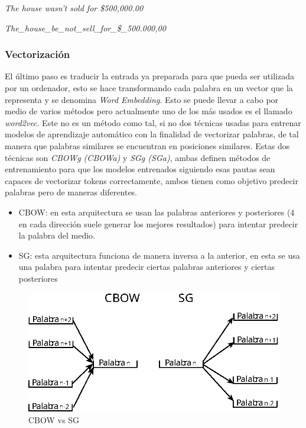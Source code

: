 \begin{center}
	\textit{The house wasn't sold for \$500,000.00}

	\textit{The\_house\_be\_not\_sell\_for\_\$\_500.000,00}
\end{center}

\subsubsection{Vectorización}
El último paso es traducir la entrada ya preparada para que pueda ser utilizada
por un ordenador, esto se hace transformando cada palabra en un vector que la
representa y se denomina \textit{Word Embedding}. Esto se puede llevar a cabo
por medio de varios métodos pero actualmente uno de los más usados es el llamado
\textit{word2vec}\cite{text2vec,text2vecTF}. Este no es un método como tal, si
no dos técnicas usadas para entrenar modelos de aprendizaje automático con la
finalidad de vectorizar palabras, de tal manera que palabras similares se
encuentran en posiciones similares. Estas dos técnicas son
\textit{\gls{CBOWg} (\gls{CBOWa})} y \textit{\gls{SGg} (\gls{SGa})}, ambas definen métodos de entrenamiento para que los
modelos entrenados siguiendo esas pautas sean capaces de vectorizar tokens
correctamente, ambos tienen como objetivo predecir palabras pero de maneras
diferentes.
\begin{itemize}
	\item CBOW: en esta arquitectura se usan las palabras anteriores y
	posteriores (4 en cada dirección suele generar los mejores resultados) para intentar
	predecir la palabra del medio.
	\item SG: esta arquitectura funciona de manera inversa a la anterior, en
	esta se usa una palabra para intentar predecir ciertas palabras anteriores y
	ciertas posteriores
\end{itemize}

\begin{figure}[H]
	\includegraphics[scale=1]{imagenes/CBOWvsSG.eps}
	\centering
	\captionsetup{justification=centering}
	\caption{CBOW vs SG}
	\label{CBOW vs SG}
\end{figure}

